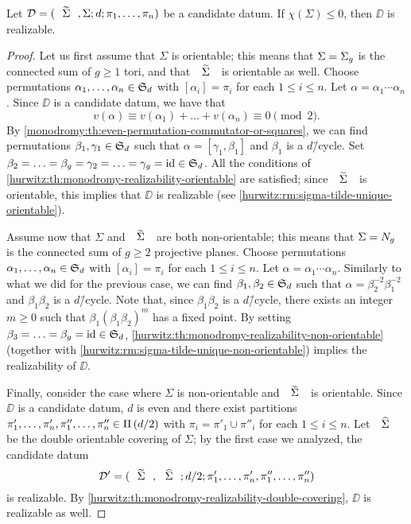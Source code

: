 \begin{theorem}\label{monodromy:th:realizability-nonpositive-chi}
Let $\DD=\datum{\tSigma,\Sigma}{d}{\pi_1,\ldots,\pi_n}$ be a candidate datum. If $\chi(\Sigma)\le 0$, then $\DD$ is realizable.
\end{theorem}
\begin{proof}
Let us first assume that $\Sigma$ is orientable; this means that $\Sigma=\Sigma_{g}$ is the connected sum of $g\ge 1$ tori, and that $\tSigma$ is orientable as well. Choose permutations $\alpha_1,\ldots,\alpha_n\in\symgroup[d]$ with $[\alpha_i]=\pi_i$ for each $1\le i\le n$. Let $\alpha=\alpha_1\cdots\alpha_n$. Since $\DD$ is a candidate datum, we have that
\[
v(\alpha)\equiv v(\alpha_1)+\ldots+v(\alpha_n)\equiv 0\pmod{2}.
\]
By \cref{monodromy:th:even-permutation-commutator-or-squares}, we can find permutations $\beta_1,\gamma_1\in\symgroup[d]$ such that $\alpha=[\gamma_1,\beta_1]$ and $\beta_1$ is a $d$\=/cycle. Set $\beta_2=\ldots=\beta_g=\gamma_2=\ldots=\gamma_g=\id\in\symgroup[d]$. All the conditions of \cref{hurwitz:th:monodromy-realizability-orientable} are satisfied; since $\tSigma$ is orientable, this implies that $\DD$ is realizable (see \cref{hurwitz:rm:sigma-tilde-unique-orientable}).

Assume now that $\Sigma$ and $\tSigma$ are both non-orientable; this means that $\Sigma=N_{g}$ is the connected sum of $g\ge 2$ projective planes. Choose permutations $\alpha_1,\ldots,\alpha_n\in\symgroup[d]$ with $[\alpha_i]=\pi_i$ for each $1\le i\le n$. Let $\alpha=\alpha_1\cdots\alpha_n$. Similarly to what we did for the previous case, we can find $\beta_1,\beta_2\in\symgroup[d]$ such that $\alpha=\beta_2^{-2}\beta_1^{-2}$ and $\beta_1\beta_2$ is a $d$\=/cycle. Note that, since $\beta_1\beta_2$ is a $d$\=/cycle, there exists an integer $m\ge 0$ such that $\beta_1(\beta_1\beta_2)^m$ has a fixed point. By setting $\beta_3=\ldots=\beta_g=\id\in\symgroup[d]$, \cref{hurwitz:th:monodromy-realizability-non-orientable} (together with \cref{hurwitz:rm:sigma-tilde-unique-non-orientable}) implies the realizability of $\DD$.

Finally, consider the case where $\Sigma$ is non-orientable and $\tSigma$ is orientable. Since $\DD$ is a candidate datum, $d$ is even and there exist partitions $\pi'_1,\ldots,\pi'_n,\pi''_1,\ldots,\pi''_n\in\Pi\left(d/2\right)$ with $\pi_i=\pi'_1\cup\pi''_i$ for each $1\le i\le n$. Let $\hSigma$ be the double orientable covering of $\Sigma$; by the first case we analyzed, the candidate datum
\[
\DD'=\datum{\tSigma,\hSigma}{d/2}{\pi'_1,\ldots,\pi'_n,\pi''_1,\ldots,\pi''_n}
\]
is realizable. By \cref{hurwitz:th:monodromy-realizability-double-covering}, $\DD$ is realizable as well.
\end{proof}

